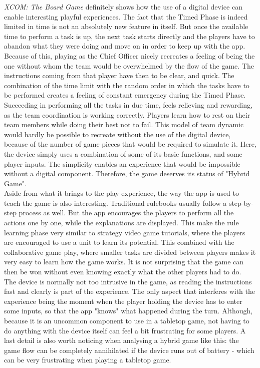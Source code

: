 \textit{XCOM: The Board Game} definitely shows how the use of a digital device can enable interesting playful experiences. The fact that the Timed Phase is indeed limited in time is not an absolutely new feature in itself. But once the available time to perform a task is up, the next task starts directly and the players have to abandon what they were doing and move on in order to keep up with the app. Because of this, playing as the Chief Officer nicely recreates a feeling of being the one without whom the team would be overwhelmed by the flow of the game. The instructions coming from that player have then to be clear, and quick. The combination of the time limit with the random order in which the tasks have to be performed creates a feeling of constant emergency during the Timed Phase. Succeeding in performing all the tasks in due time, feels relieving and rewarding, as the team coordination is working correctly. Players learn how to rest on their team members while doing their best not to fail. This model of team dynamic would hardly be possible to recreate without the use of the digital device, because of the number of game pieces that would be required to simulate it. Here, the device simply uses a combination of some of its basic functions, and some player inputs. The simplicity enables an experience that would be impossible without a digital component. Therefore, the game deserves its status of "Hybrid Game".\\
Aside from what it brings to the play experience, the way the app is used to teach the game is also interesting. Traditional rulebooks usually follow a step-by-step process as well. But the app encourages the players to perform all the actions one by one, while the explanations are displayed. This make the rule learning phase very similar to strategy video game tutorials, where the players are encouraged to use a unit to learn its potential. This combined with the collaborative game play, where smaller tasks are divided between players makes it very easy to learn how the game works. It is not surprising that the game can then be won without even knowing exactly what the other players had to do.\\
The device is normally not too intrusive in the game, as reading the instructions fast and clearly is part of the experience. The only aspect that interferes with the experience being the moment when the player holding the device has to enter some inputs, so that the app "knows" what happened during the turn. Although, because it is an uncommon component to use in a tabletop game, not having to do anything with the device itself can feel a bit frustrating for some players. A last detail is also worth noticing when analysing a hybrid game like this: the game flow can be completely annihilated if the device runs out of battery - which can be very frustrating when playing a tabletop game. 
